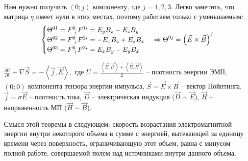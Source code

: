 \documentclass[__main__.tex]{subfiles}
\begin{document}
Нам нужно получить $(0;j)$ компоненту, где $j=1,2,3$. Легко заметить, что матрица $\eta$ имеет нули в этих местах, поэтому работаем только с уменьшаемым:
\begin{gather*}
    \begin{cases}
        \Theta^{01} = F\indices{^0_i}F^{1i} = E_yB_z-E_zB_y  \\
        \Theta^{02} = F\indices{^0_i}F^{2i} = -E_xB_z+E_zB_x \\
        \Theta^{03} = F\indices{^0_i}F^{3i} = E_xB_y-E_yB_x  \\
    \end{cases}
    \Rightarrow
    \Theta^{0j}=\left(\vec{E}\times\vec{B}\right)^{j}
\end{gather*}

\begin{theorem}
    $\frac{\partial U}{\partial t}+\nabla\vec{S} = -\left<\vec{j},\vec{E}\right>,$ где $U=\frac{\left<\vec{E},\vec{D}\right>+\left<\vec{B},\vec{H}\right>}{2}$ -- плотность энергии ЭМП, $(0;0)$ компонента тензора энергии-импульса, $\vec{S}=\vec{E}\times\vec{B}$ -- вектор Пойнтинга, $\vec{j}=\sigma\vec{E}$ -- плотность тока, $\vec{D}$ -- электрическая индукция ($\vec{D}\sim\vec{E}$), $\vec{H}$ -- напряженность МП ($\vec{H}\sim\vec{B}$).
\end{theorem}

Смысл этой теоремы в следующем: скорость возрастания электромагнитной энергии внутри некоторого объема в сумме с энергией, вытекающей за единицу времени через поверхность, ограничивающую этот объем, равна с минусом полной работе, совершаемой полем над источниками внутри данного объема.
\end{document}
